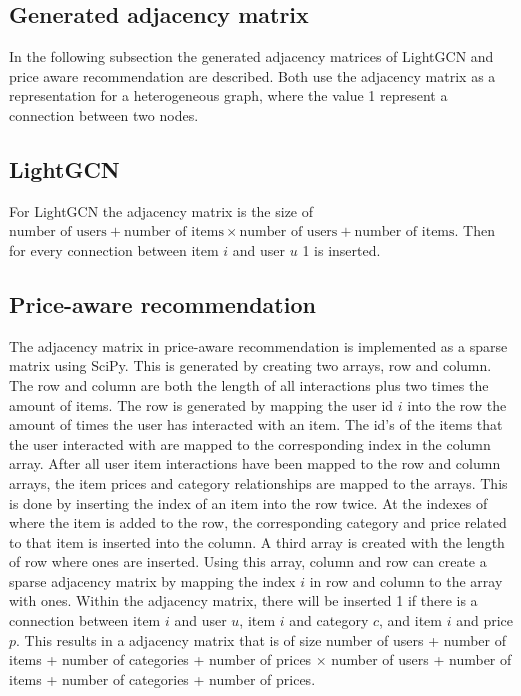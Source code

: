 \subsection{Generated adjacency matrix}
In the following subsection the generated adjacency matrices of LightGCN and price aware recommendation are described.
Both use the adjacency matrix as a representation for a heterogeneous graph, where the value 1 represent a connection between two nodes.

\subsection{LightGCN}
For LightGCN the adjacency matrix is the size of $\textrm{number of users} + \textrm{number of items} \times \textrm{number of users} + \textrm{number of items}$.
Then for every connection between item $i$ and user $u$ 1 is inserted.

\subsection{Price-aware recommendation}
The adjacency matrix in price-aware recommendation is implemented as a sparse matrix using SciPy.
This is generated by creating two arrays, row and column.
The row and column are both the length of all interactions plus two times the amount of items.
The row is generated by mapping the user id $i$ into the row the amount of times the user has interacted with an item.
The id's of the items that the user interacted with are mapped to the corresponding index in the column array.
After all user item interactions have been mapped to the row and column arrays, the item prices and category relationships are mapped to the arrays.
This is done by inserting the index of an item into the row twice.
At the indexes of where the item is added to the row, the corresponding category and price related to that item is inserted into the column.
A third array is created with the length of row where ones are inserted.
Using this array, column and row can create a sparse adjacency matrix by mapping the index $i$ in row and column to the array with ones.
Within the adjacency matrix, there will be inserted 1 if there is a connection between item $i$ and user $u$, item $i$ and category $c$, and item $i$ and price $p$.
This results in a adjacency matrix that is of size number of users + number of items + number of categories + number of prices $\times$ number of users + number of items + number of categories + number of prices.
